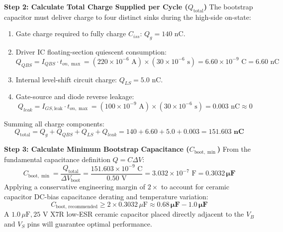 \documentclass[11pt,a4paper]{article}
\begin{document}
\begin{examplebox}
\textbf{Step 2: Calculate Total Charge Supplied per Cycle ($Q_{\text{total}}$)}
The bootstrap capacitor must deliver charge to four distinct sinks during the high-side on-state:
\begin{enumerate}
  \item Gate charge required to fully charge $C_{iss}$: $Q_g = 140\text{ nC}$.
  \item Driver IC floating-section quiescent consumption:
  \begin{equation}
  Q_{QBS} = I_{QBS} \cdot t_{on,\max} = (220 \times 10^{-6}\text{ A}) \times (30 \times 10^{-6}\text{ s}) = 6.60 \times 10^{-9}\text{ C} = 6.60\text{ nC}
  \end{equation}
  \item Internal level-shift circuit charge: $Q_{LS} = 5.0\text{ nC}$.
  \item Gate-source and diode reverse leakage:
  \begin{equation}
  Q_{leak} = I_{GS,\text{leak}} \cdot t_{on,\max} = (100 \times 10^{-9}\text{ A}) \times (30 \times 10^{-6}\text{ s}) = 0.003\text{ nC} \approx 0
  \end{equation}
\end{enumerate}
Summing all charge components:
\begin{equation}
Q_{\text{total}} = Q_g + Q_{QBS} + Q_{LS} + Q_{leak} = 140 + 6.60 + 5.0 + 0.003 = \mathbf{151.603\text{ nC}}
\end{equation}

\textbf{Step 3: Calculate Minimum Bootstrap Capacitance ($C_{\text{boot},\min}$)}
From the fundamental capacitance definition $Q = C \Delta V$:
\begin{equation}
C_{\text{boot},\min} = \frac{Q_{\text{total}}}{\Delta V_{\text{boot}}} = \frac{151.603 \times 10^{-9}\text{ C}}{0.50\text{ V}} = 3.032 \times 10^{-7}\text{ F} = \mathbf{0.3032\,\mu\text{F}}
\end{equation}
Applying a conservative engineering margin of $2\times$ to account for ceramic capacitor DC-bias capacitance derating and temperature variation:
\begin{equation}
C_{\text{boot, recommended}} \ge 2 \times 0.3032\,\mu\text{F} \approx \mathbf{0.68\,\mu\text{F} - 1.0\,\mu\text{F}}
\end{equation}
A $1.0\,\mu\text{F}, 25\text{ V}$ X7R low-ESR ceramic capacitor placed directly adjacent to the $V_B$ and $V_S$ pins will guarantee optimal performance.
\end{examplebox}
\end{document}

